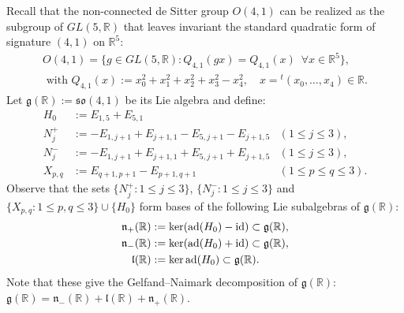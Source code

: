\documentclass[12pt, pdflatex, a4paper]{article}
\theoremstyle{plain}
\theoremstyle{definition}
\def\ad{\text{\normalfont{ad}}}
\def\g{\mathfrak{g}}
\def\id{\text{\normalfont{id}}}
\def\l{\mathfrak{l}}
\def\n{\mathfrak{n}}
\def\R{{\mathbb R}}
\def\so{\mathfrak{so}}
\begin{document}
Recall that the non-connected de Sitter group $O(4,1)$ can be realized as the subgroup of $GL(5, \R)$ that leaves invariant the standard quadratic form of signature $(4,1)$ on $\R^5$:
\begin{align*}
O(4,1) = \{g \in GL(5,\R) : Q_{4,1}(gx) = Q_{4,1}(x) \enspace \forall x \in \R^5\},\\
\text{ with }Q_{4,1}(x) := x_0^2 + x_1^2 + x_2^2 + x_3^2 - x_4^2, \quad x = {}^t(x_0, \dots, x_4) \in \R.
\end{align*}
Let $\g(\R) := \so(4,1)$ be its Lie algebra and define:
\begin{equation}\label{elements}
\begin{aligned}
H_0 & := E_{1,5}+E_{5,1}\\
N_j^+ & := -E_{1,j+1} + E_{j+1,1} - E_{5,j+1} - E_{j+1,5} & (1 \leq j  \leq 3),\\
N_j^- & := -E_{1,j+1} + E_{j+1,1} + E_{5,j+1} + E_{j+1,5} & (1 \leq j  \leq 3),\\
X_{p,q} & := E_{q+1, p+1} - E_{p+1, q+1} & (1 \leq p \leq q \leq 3).
\end{aligned}
\end{equation}
Observe that the sets $\{N_j^+: 1 \leq j  \leq 3\}$, $\{N_j^-: 1 \leq j  \leq 3\}$ and $\{X_{p,q} : 1 \leq p,q \leq 3\}\cup\{H_0\}$ form bases of the following Lie subalgebras of $\g(\R)$:
\begin{equation*}
\begin{aligned}
\n_+(\R) & := \ker(\ad(H_0) - \id)\subset \g(\R),\\
\n_-(\R) & := \ker(\ad(H_0) + \id)\subset \g(\R),\\
\l(\R) & := \ker\ad(H_0)\subset \g(\R).
\end{aligned}
\end{equation*}
Note that these give the Gelfand--Naimark decomposition of $\g(\R)$: $\g(\R) = \n_-(\R) + \l(\R) + \n_+(\R)$.
\end{document}
